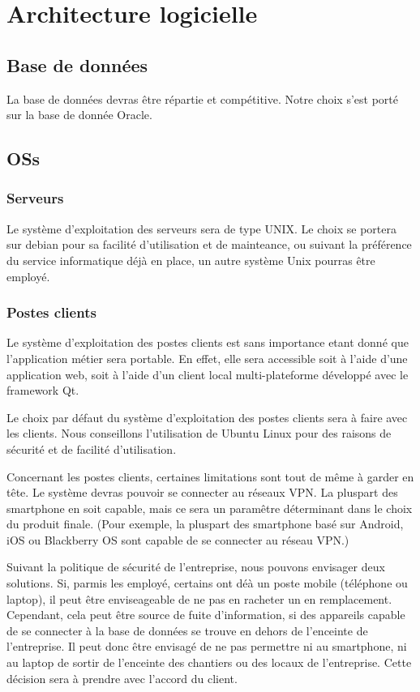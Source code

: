 \section{Architecture logicielle}

    \subsection{Base de données}
        La base de données devras être répartie et compétitive.
        Notre choix s'est porté sur la base de donnée Oracle.
        
    \subsection{OSs}
        \subsubsection{Serveurs}
            Le système d'exploitation des serveurs sera de type UNIX.
            Le choix se portera sur debian pour sa facilité d'utilisation et de mainteance, ou suivant la préférence du service informatique déjà en place, un autre système Unix pourras être employé.
        \subsubsection{Postes clients}
            Le système d'exploitation des postes clients est sans importance etant donné que l'application métier sera portable.
            En effet, elle sera accessible soit à l'aide d'une application web, soit à l'aide d'un client local multi-plateforme développé avec le framework Qt.
            
            Le choix par défaut du système d'exploitation des postes clients sera à faire avec les clients.
            Nous conseillons l'utilisation de Ubuntu Linux pour des raisons de sécurité et de facilité d'utilisation.
            
            Concernant les postes clients, certaines limitations sont tout de même à garder en tête.
            Le système devras pouvoir se connecter au réseaux VPN.
            La pluspart des smartphone en soit capable, mais ce sera un paramêtre déterminant dans le choix du produit finale.
            (Pour exemple, la pluspart des smartphone basé sur Android, iOS ou Blackberry OS sont capable de se connecter au réseau VPN.)
            
            Suivant la politique de sécurité de l'entreprise, nous pouvons envisager deux solutions.
            Si, parmis les employé, certains ont déà un poste mobile (téléphone ou laptop), il peut être enviseageable de ne pas en racheter un en remplacement. Cependant, cela peut être source de fuite d'information, si des appareils capable de se connecter à la base de données se trouve en dehors de l'enceinte de l'entreprise.
            Il peut donc être envisagé de ne pas permettre ni au smartphone, ni au laptop de sortir de l'enceinte des chantiers ou des locaux de l'entreprise.
            Cette décision sera à prendre avec l'accord du client.

    
